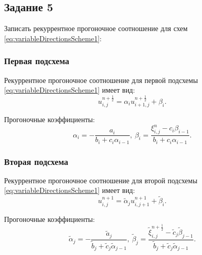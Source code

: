 \documentclass[12pt, a4paper]{report}
\begin{document}
	\subsection*{Задание 5}
	\large
	Записать рекуррентное прогоночное соотношение для схем \eqref{eq:variableDirectionsScheme1}:
	\subsubsection*{Первая подсхема}
	\large
	Рекуррентное прогоночное соотношение для первой подсхемы \eqref{eq:variableDirectionsScheme1} имеет вид:
	\begin{equation*}
		u_{i, j}^{n+\frac{1}{2}} = \alpha_{i}u_{i+1, j}^{n+\frac{1}{2}} + \beta_{i}.
	\end{equation*}
	\par
	Прогоночные коэффициенты:
	\begin{equation*}
		\alpha_{i} = -\frac{a_{i}}{b_{i} + c_{i}\alpha_{i-1}}, \> \beta_{i} = \frac{\xi_{i, j}^{n} - c_{i}\beta_{i-1}}{b_{i} + c_{i}\alpha_{i-1}}.
	\end{equation*}
	\subsubsection*{Вторая подсхема}
	\large
	Рекуррентное прогоночное соотношение для второй подсхемы \eqref{eq:variableDirectionsScheme1} имеет вид:
	\begin{equation*}
		u_{i, j}^{n+1} = \tilde{\alpha}_{j}u_{i, j+1}^{n+1} + \tilde{\beta}_{i}.
	\end{equation*}
	\par
	Прогоночные коэффициенты:
	\begin{equation*}
		\tilde{\alpha}_{j} = -\frac{\tilde{a}_{j}}{\tilde{b}_{j} + \tilde{c}_{j}\tilde{\alpha}_{j-1}}, \> \tilde{\beta}_{j} = \frac{\tilde{\xi}_{i, j}^{n+\frac{1}{2}} - \tilde{c}_{j}\tilde{\beta}_{j-1}}{\tilde{b}_{j} + \tilde{c}_{j}\tilde{\alpha}_{j-1}}.
	\end{equation*}
\end{document}
